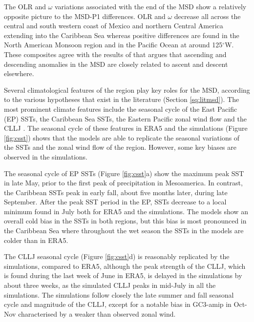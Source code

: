  
 The OLR and $\omega$ variations associated with the end of the MSD show a relatively opposite picture to the MSD-P1 differences. OLR and $\omega$ decrease all across the central and south western coast of Mexico and northern Central America extending into the Caribbean Sea whereas positive differences are found in the North American Monsoon region and in the Pacific Ocean at around 125$^\circ$W.  These composites agree with the results of \cite{herrera2015} that argues that ascending and descending anomalies in the MSD are closely related to ascent and descent elsewhere.

Several climatological features of the region play key roles for the MSD, according to the various hypotheses that exist in the literature (Section \ref{sq:litmsd}). The most prominent climate features include the seasonal cycle of the East Pacific (EP) SSTs, the Caribbean Sea SSTs, the Eastern Pacific zonal wind flow and the CLLJ \citep{magana1999,amador2008,herrera2015,straffon2019,garcia2020sub}. 
The seasonal cycle of these features in ERA5 and the simulations (Figure \ref{fig:csst}) shows that the models are able to replicate the seasonal variations of the SSTs and the zonal wind flow of the region. However, some key biases are observed in the simulations.

The seasonal cycle of EP SSTs (Figure \ref{fig:csst}a) show the maximum peak SST in late May, prior to the first peak of precipitation in Mesoamerica. In contrast, the Caribbean SSTs peak in early fall, about five months later, during late September. After the peak SST period in the EP, SSTs decrease to a local minimum found in July both for ERA5 and the simulations. The models show an overall cold bias in the SSTs in both regions, but this bias is most pronounced in the Caribbean Sea where throughout the wet season the SSTs in the models are colder than in ERA5. 

The CLLJ seasonal cycle (Figure \ref{fig:csst}d) is reasonably replicated by the simulations, compared to ERA5, although the peak strength of the CLLJ, which is found during the last week of June in ERA5, is delayed in the simulations by about three weeks, as the simulated CLLJ peaks in mid-July in all the simulations.
The simulations follow closely the late summer and fall seasonal cycle and magnitude of the CLLJ, except for a notable bias in GC3-amip in Oct-Nov characterised by a weaker than observed zonal wind. 

